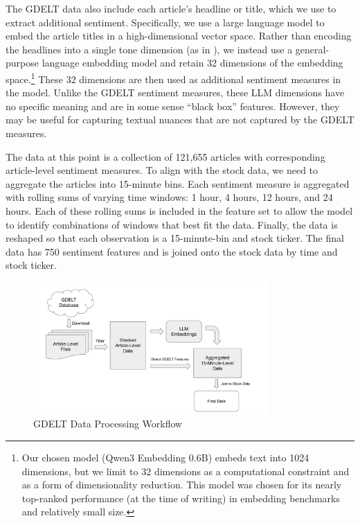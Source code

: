 \documentclass[12pt]{article}
\begin{document}
The GDELT data also include each article's headline or title, which we use to extract additional sentiment. Specifically, we use a large language model to embed the article titles in a high-dimensional vector space. Rather than encoding the headlines into a single tone dimension (as in \textcite{huang2023finbert}), we instead use a general-purpose language embedding model and retain 32 dimensions of the embedding space.\footnote{Our chosen model (Qwen3 Embedding 0.6B) embeds text into 1024 dimensions, but we limit to 32 dimensions as a computational constraint and as a form of dimensionality reduction. This model was chosen for its nearly top-ranked performance (at the time of writing) in embedding benchmarks and relatively small size.} These 32 dimensions are then used as additional sentiment measures in the model. Unlike the GDELT sentiment measures, these LLM dimensions have no specific meaning and are in some sense ``black box'' features. However, they may be useful for capturing textual nuances that are not captured by the GDELT measures.

The data at this point is a collection of 121,655 articles with corresponding article-level sentiment measures. To align with the stock data, we need to aggregate the articles into 15-minute bins. Each sentiment measure is aggregated with rolling sums of varying time windows: 1 hour, 4 hours, 12 hours, and 24 hours. Each of these rolling sums is included in the feature set to allow the model to identify combinations of windows that best fit the data. Finally, the data is reshaped so that each observation is a 15-minute-bin and stock ticker. The final data has 750 sentiment features and is joined onto the stock data by time and stock ticker.

\begin{figure}[H]
\centering
\caption{GDELT Data Processing Workflow}
\includegraphics[width=0.8\textwidth]{../Output/GDELT Processing Diagram.pdf}
\end{figure}
\end{document}
